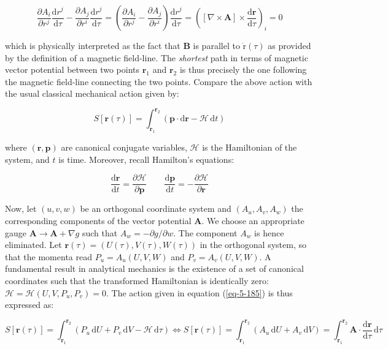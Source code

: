 \begin{equation}
    \frac{\partial A_i}{\partial r^j}\frac{\mathrm{d}r^j}{\mathrm{d}\tau}-\frac{\partial A_j}{\partial r^i}\frac{\mathrm{d}r^j}{\mathrm{d}\tau}=\left(\frac{\partial A_i}{\partial r^j}-\frac{\partial A_j}{\partial r^i}\right)\frac{\mathrm{d}r^j}{\mathrm{d}\tau}=\left(\left[\nabla\times\mathbf{A}\right]\times\frac{\mathrm{d}\mathbf{r}}{\mathrm{d}\tau}\right)_i=0
\end{equation}

which is physically interpreted as the fact that $\mathbf{B}$ is parallel to $\dot{\mathrm{r}}(\tau)$ as provided by the definition of a magnetic field-line. The \textit{shortest} path in terms of magnetic vector potential between two points $\mathbf{r}_1$ and $\mathbf{r}_2$ is thus precisely the one following the magnetic field-line connecting the two points. Compare the above action with the usual classical mechanical action given by:

\begin{equation}
    S[\mathbf{r}(\tau)]=\int_{\mathbf{r}_1}^{\mathbf{r}_2}\left(\mathbf{p}\cdot\text{d}\mathbf{r}-\mathcal{H}\,\text{d}t\right)
\end{equation}

where $(\mathbf{r},\mathbf{p})$ are canonical conjugate variables, $\mathcal{H}$ is the Hamiltonian of the system, and $t$ is time. Moreover, recall Hamilton's equations:

\begin{equation}
    \frac{\mathrm{d}\mathbf{r}}{\mathrm{d}t}=\frac{\partial\mathcal{H}}{\partial\mathbf{p}}\qquad\frac{\mathrm{d}\mathbf{p}}{\mathrm{d}t}=-\frac{\partial\mathcal{H}}{\partial\mathbf{r}}
\end{equation}

Now, let $(u,v,w)$ be an orthogonal coordinate system and $(A_u,A_v,A_w)$ the corresponding components of the vector potential $\mathbf{A}$. We choose an appropriate gauge $\mathbf{A}\to\mathbf{A}+\nabla g$ such that $A_w=-\partial g/\partial w$. The component $A_w$ is hence eliminated. Let $\mathbf{r}(\tau)=(U(\tau),V(\tau),W(\tau))$ in the orthogonal system, so that the momenta read $P_u=A_u(U,V,W)$ and $P_v=A_v(U,V,W)$. A fundamental result in analytical mechanics is the existence of a set of canonical coordinates such that the transformed Hamiltonian is identically zero: $\mathcal{H}=\mathcal{H}(U, V, P_u, P_v)=0$. The action given in equation (\ref{eq-5-185}) is thus expressed as:

\begin{equation}
    \label{eq-5-188}
    S[\mathbf{r}(\tau)]=\int_{\mathbf{r}_1}^{\mathbf{r}_2}\left(P_u\,\text{d}U+P_v\,\text{d}V-\mathcal{H}\,\text{d}\tau\right)\Longleftrightarrow S[\mathbf{r}(\tau)]=\int_{\mathbf{r}_1}^{\mathbf{r}_2}\left(A_u\,\mathrm{d}U+A_v\,\mathrm{d}V\right)=\int_{\mathbf{r}_1}^{\mathbf{r}_2}\mathbf{A}\cdot\frac{\mathrm{d}\mathbf{r}}{\mathrm{d}\tau}\,\mathrm{d}\tau
\end{equation}

